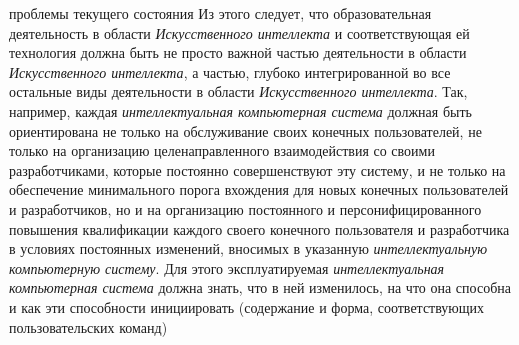 \begin{scnsubstruct}
\begin{scnrelfromset}{проблемы текущего состояния}
{            \bigskip 
            Из этого следует, что образовательная деятельность в области \textit{Искусственного интеллекта} и соответствующая ей технология должна быть не просто важной частью деятельности в области \textit{Искусственного интеллекта}, а частью, глубоко интегрированной во все остальные виды деятельности в области \textit{Искусственного интеллекта}. Так, например, каждая \textit{интеллектуальная компьютерная система} должная быть ориентирована не только на обслуживание своих конечных пользователей, не только на организацию целенаправленного взаимодействия со своими разработчиками, которые постоянно совершенствуют эту систему, и не только на обеспечение минимального порога вхождения для новых конечных пользователей и разработчиков, но и на организацию постоянного и персонифицированного повышения квалификации каждого своего конечного пользователя и разработчика в условиях постоянных изменений, вносимых в указанную \textit{интеллектуальную компьютерную систему}. Для этого эксплуатируемая \textit{интеллектуальная компьютерная система} должна знать, что в ней изменилось, на что она способна и как эти способности инициировать (содержание и форма, соответствующих пользовательских команд)}
    \end{scnrelfromset}
    \bigskip
    

\end{scnsubstruct}
